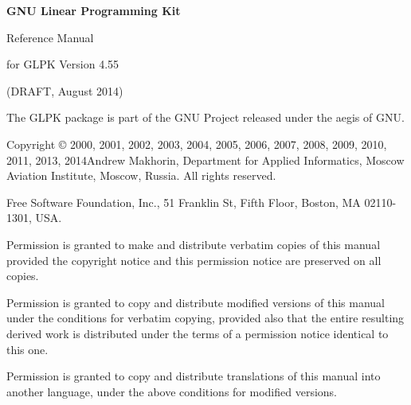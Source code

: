 \documentclass[11pt]{report}
\begin{document}
\thispagestyle{empty}

\begin{center}

\vspace*{1.5in}

\begin{huge}
\sf\bfseries GNU Linear Programming Kit
\end{huge}

\vspace{0.5in}

\begin{LARGE}
\sf Reference Manual
\end{LARGE}

\vspace{0.5in}

\begin{LARGE}
\sf for GLPK Version 4.55
\end{LARGE}

\vspace{0.5in}
\begin{Large}
\sf (DRAFT, August 2014)
\end{Large}
\end{center}

\newpage

\vspace*{1in}

\vfill

\noindent
The GLPK package is part of the GNU Project released under the aegis of
GNU.

\noindent
Copyright \copyright{} 2000, 2001, 2002, 2003, 2004, 2005, 2006, 2007,
2008, 2009, 2010, 2011, 2013, 2014\linebreak Andrew Makhorin,
Department for Applied Informatics, Moscow Aviation Institute, Moscow,
Russia. All rights reserved.

\noindent
Free Software Foundation, Inc., 51 Franklin St, Fifth Floor, Boston, MA
02110-1301, USA.

\noindent
Permission is granted to make and distribute verbatim copies of this
manual provided the copyright notice and this permission notice are
preserved on all copies.

\noindent
Permission is granted to copy and distribute modified versions of this
manual under the conditions for verbatim copying, provided also that
the entire resulting derived work is distributed under the terms of
a permission notice identical to this one.

\noindent
Permission is granted to copy and distribute translations of this
manual into another language, under the above conditions for modified
versions.
\end{document}
